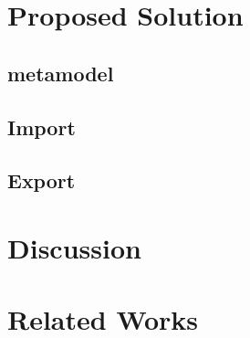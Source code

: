 \documentclass[conference]{IEEEtran}
\begin{document}
    \section{Proposed Solution}
    \label{sec:contribution}
    
    \subsection{metamodel}
    
    \subsection{Import}
    
    \subsection{Export}
    
    
    
    \section{Discussion}
    \label{sec:discussion}
    
    
    
    
    
    \section{Related Works}
    \label{sec:related}
    
\end{document}
